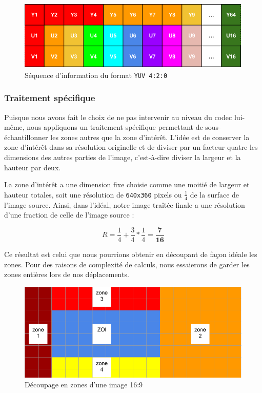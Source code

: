 \documentclass[11pt,a4paper]{article}
\begin{document}
\begin{figure}[H]
\begin{center}
\includegraphics[scale=0.5]{images/yuv2.png}
\end{center}
\caption{Séquence d'information du format \texttt{YUV 4:2:0}}
\label{}
\end{figure}

\bigbreak

\subsubsection{Traitement spécifique}

Puisque nous avons fait le choix de ne pas intervenir au niveau du codec lui-même, nous appliquons un traitement spécifique permettant de sous-échantillonner les zones autres que la zone d'intérêt.
L'idée est de conserver la zone d'intérêt dans sa résolution originelle et de diviser par un facteur quatre les dimensions des autres parties de l'image, c'est-à-dire diviser la largeur et la hauteur par deux.

\bigbreak
La zone d'intérêt a une dimension fixe choisie comme une moitié de largeur et hauteur totales, soit une résolution de \texttt{640x360} pixels ou $\frac{1}{4}$ de la surface de l'image source.
Ainsi, dans l'idéal, notre image traîtée finale a une résolution d'une fraction de celle de l'image source :

$$ R = \frac{1}{4} + \frac{3}{4}*\frac{1}{4} = \mathbf{\frac{7}{16}} $$

\bigbreak

Ce résultat est celui que nous pourrions obtenir en découpant de façon idéale les zones.
Pour des raisons de complexité de calculs, nous essaierons de garder les zones entières lors de nos déplacements.

\begin{figure}[H]
\begin{center}
\includegraphics[scale=0.4]{images/decoupage.png}
\end{center}
\caption{Découpage en zones d'une image 16:9}
\label{}
\end{figure}
\end{document}
